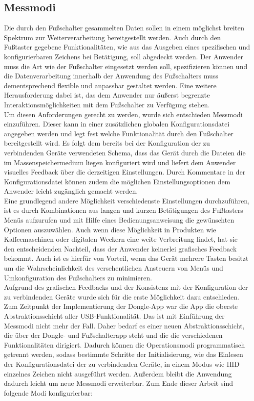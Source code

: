 \subsection{Messmodi}
Die durch den Fußschalter gesammelten Daten sollen in einem möglichst breiten Spektrum zur Weiterverarbeitung bereitgestellt werden. Auch durch den Fußtaster gegebene Funktionalitäten, wie aus das Ausgeben eines spezifischen und konfigurierbaren Zeichens bei Betätigung, soll abgedeckt werden. Der Anwender muss die Art wie der Fußschalter eingesetzt werden soll, spezifizieren können und die Datenverarbeitung innerhalb der Anwendung des Fußschalters muss dementsprechend flexible und anpassbar gestaltet werden. Eine weitere Herausforderung dabei ist, das dem Anwender nur äußerst begrenzte Interaktionsmöglichkeiten mit dem Fußschalter zu Verfügung stehen.\\
Um diesen Anforderungen gerecht zu werden, wurde sich entschieden Messmodi einzuführen. Dieser kann in einer zusätzlichen globalen Konfigurationsdatei angegeben werden und legt fest welche Funktionalität durch den Fußschalter bereitgestellt wird. Es folgt dem bereits bei der Konfiguration der zu verbindenden Geräte verwendeten Schema, dass das Gerät durch die Dateien die im Massenspeichermedium liegen konfiguriert wird und liefert dem Anwender visuelles Feedback über die derzeitigen Einstellungen. Durch Kommentare in der Konfigurationsdatei können zudem die möglichen Einstellungsoptionen dem Anwender leicht zugänglich gemacht werden.\\
Eine grundlegend andere Möglichkeit verschiedenste Einstellungen durchzuführen, ist es durch Kombinationen aus langen und kurzen Betätigungen des Fußtasters Menüs aufzurufen und mit Hilfe eines Bedienungsanweisung die gewünschten Optionen auszuwählen. Auch wenn diese Möglichkeit in Produkten wie Kaffeemaschinen oder digitalen Weckern eine weite Verbreitung findet, hat sie den entscheidenden Nachteil, dass der Anwender keinerlei grafisches Feedback bekommt. Auch ist es hierfür von Vorteil, wenn das Gerät mehrere Tasten besitzt um die Wahrscheinlichkeit des versehentlichen Ansteuern von Menüs und Umkonfiguration des Fußschalters zu minimieren.\\
Aufgrund des grafischen Feedbacks und der Konsistenz mit der Konfiguration der zu verbindenden Geräte wurde sich für die erste Möglichkeit dazu entschieden. Zum Zeitpunkt der Implementierung der Dongle-App war die App die oberste Abstraktionsschicht aller USB-Funktionalität. Das ist mit Einführung der Messmodi nicht mehr der Fall. Daher bedarf es einer neuen Abstraktionsschicht, die über der Dongle- und Fußschalterapp steht und die die verschiedenen Funktionalitäten dirigiert. Dadurch können die Operationsmodi programmatisch getrennt werden, sodass bestimmte Schritte der Initialisierung, wie das Einlesen der Konfigurationsdatei der zu verbindenden Geräte, in einem Modus wie \ac{HID} einzelnes Zeichen nicht ausgeführt werden. Außerdem bleibt die Anwendung dadurch leicht um neue Messmodi erweiterbar. Zum Ende dieser Arbeit sind folgende Modi konfigurierbar:
